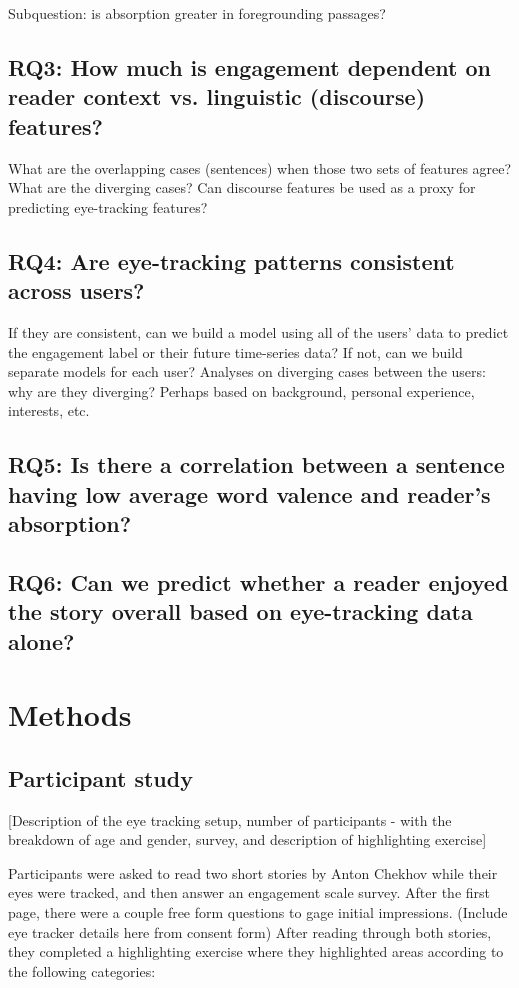 \documentclass[11pt]{article}
\begin{document}
Subquestion: is absorption greater in foregrounding passages?

\subsection{RQ3: How much is engagement dependent on reader context vs. linguistic (discourse) features?}

What are the overlapping cases (sentences) when those two sets of features agree? What are the diverging cases? Can discourse features be used as a proxy for predicting eye-tracking features?

\subsection{RQ4: Are eye-tracking patterns consistent across users?}

If they are consistent, can we build a model using all of the users’ data to predict the engagement label or their future time-series data? If not, can we build separate models for each user? Analyses on diverging cases between the users: why are they diverging? Perhaps based on background, personal experience, interests, etc.

\subsection{RQ5: Is there a correlation between a sentence having low average word valence and reader’s absorption?}

\subsection{RQ6: Can we predict whether a reader enjoyed the story overall based on eye-tracking data alone?}

\section{Methods}

\subsection{Participant study}

[Description of the eye tracking setup, number of participants - with the breakdown of age and gender, survey, and description of highlighting exercise]

Participants were asked to read two short stories by Anton Chekhov while their eyes were tracked, and then answer an engagement scale survey. After the first page, there were a couple free form questions to gage initial impressions. (Include eye tracker details here from consent form) After reading through both stories, they completed a highlighting exercise where they highlighted areas according to the following categories:
\end{document}
